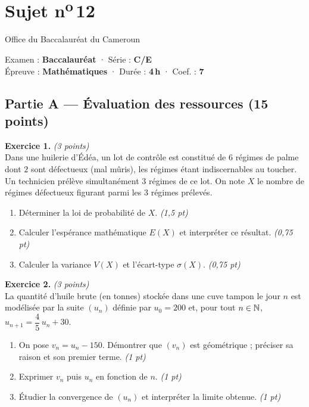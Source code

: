 \section{Sujet n\textsuperscript{o}\,12}
\noindent\begin{minipage}{0.5\linewidth}\footnotesize Office du Baccalauréat du Cameroun\end{minipage}%
\hfill\begin{minipage}{0.45\linewidth}\footnotesize\raggedleft Examen : \textbf{Baccalauréat} · Série : \textbf{C/E}\\
Épreuve : \textbf{Mathématiques} · Durée : \textbf{4\,h} · Coef. : \textbf{7}\end{minipage}
\par\smallskip{\color{onbo}\rule{\linewidth}{1pt}}

\subsection*{Partie A — Évaluation des ressources \hfill (15 points)}

\noindent\textbf{Exercice 1.} \hfill\textit{(3 points)}\\
Dans une huilerie d'Édéa, un lot de contrôle est constitué de $6$ régimes de palme
dont $2$ sont défectueux (mal mûris), les régimes étant indiscernables au toucher.
Un technicien prélève simultanément $3$ régimes de ce lot. On note $X$ le nombre de
régimes défectueux figurant parmi les $3$ régimes prélevés.
\begin{enumerate}[label=\arabic*)]
\item Déterminer la loi de probabilité de $X$. \hfill\textit{(1,5 pt)}
\item Calculer l'espérance mathématique $E(X)$ et interpréter ce résultat. \hfill\textit{(0,75 pt)}
\item Calculer la variance $V(X)$ et l'écart-type $\sigma(X)$. \hfill\textit{(0,75 pt)}
\end{enumerate}

\smallskip
\noindent\textbf{Exercice 2.} \hfill\textit{(3 points)}\\
La quantité d'huile brute (en tonnes) stockée dans une cuve tampon le jour $n$ est
modélisée par la suite $(u_n)$ définie par $u_0=200$ et, pour tout $n\in\mathbb{N}$,
$u_{n+1}=\dfrac45\,u_n+30$.
\begin{enumerate}[label=\arabic*)]
\item On pose $v_n=u_n-150$. Démontrer que $(v_n)$ est géométrique ; préciser sa raison et son premier terme. \hfill\textit{(1 pt)}
\item Exprimer $v_n$ puis $u_n$ en fonction de $n$. \hfill\textit{(1 pt)}
\item Étudier la convergence de $(u_n)$ et interpréter la limite obtenue. \hfill\textit{(1 pt)}
\end{enumerate}

